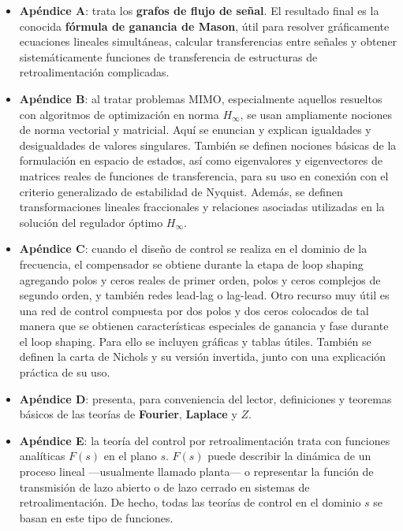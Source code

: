 \begin{itemize}
  \item \textbf{Apéndice A}: trata los \textbf{grafos de flujo de señal}. El resultado final es la conocida \textbf{fórmula de ganancia de Mason}, útil para resolver gráficamente ecuaciones lineales simultáneas, calcular transferencias entre señales y obtener sistemáticamente funciones de transferencia de estructuras de retroalimentación complicadas.

  \item \textbf{Apéndice B}: al tratar problemas MIMO, especialmente aquellos resueltos con algoritmos de optimización en norma \(H_{\infty}\), se usan ampliamente nociones de norma vectorial y matricial. Aquí se enuncian y explican igualdades y desigualdades de valores singulares. También se definen nociones básicas de la formulación en espacio de estados, así como eigenvalores y eigenvectores de matrices reales de funciones de transferencia, para su uso en conexión con el criterio generalizado de estabilidad de Nyquist. Además, se definen transformaciones lineales fraccionales y relaciones asociadas utilizadas en la solución del regulador óptimo \(H_{\infty}\).

  \item \textbf{Apéndice C}: cuando el diseño de control se realiza en el dominio de la frecuencia, el compensador se obtiene durante la etapa de loop shaping agregando polos y ceros reales de primer orden, polos y ceros complejos de segundo orden, y también redes lead-lag o lag-lead. Otro recurso muy útil es una red de control compuesta por dos polos y dos ceros colocados de tal manera que se obtienen características especiales de ganancia y fase durante el loop shaping. Para ello se incluyen gráficas y tablas útiles. También se definen la carta de Nichols y su versión invertida, junto con una explicación práctica de su uso.

  \item \textbf{Apéndice D}: presenta, para conveniencia del lector, definiciones y teoremas básicos de las teorías de \textbf{Fourier}, \textbf{Laplace} y \textbf{\(Z\)}.

  \item \textbf{Apéndice E}: la teoría del control por retroalimentación trata con funciones analíticas \(F(s)\) en el plano \(s\). \(F(s)\) puede describir la dinámica de un proceso lineal —usualmente llamado planta— o representar la función de transmisión de lazo abierto o de lazo cerrado en sistemas de retroalimentación. De hecho, todas las teorías de control en el dominio \(s\) se basan en este tipo de funciones.


\end{itemize}
